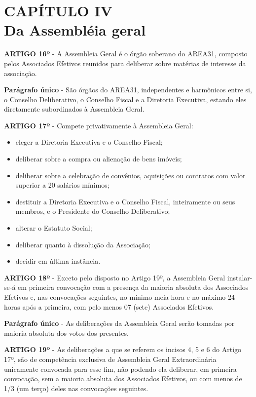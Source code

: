 \chapter*{CAPÍTULO IV \\ Da Assembléia geral}

\textbf{ARTIGO 16º} - A Assembleia Geral é o órgão soberano do AREA31, 
composto pelos Associados Efetivos reunidos para deliberar sobre matérias 
de interesse da associação.

\bigskip

\textbf{Parágrafo único} - São órgãos do AREA31, independentes e harmônicos 
entre si, o Conselho Deliberativo, o Conselho Fiscal e a Diretoria 
Executiva, estando eles diretamente subordinados à Assembleia Geral.

\bigskip

\textbf{ARTIGO 17º} - Compete privativamente à Assembleia Geral:

\begin{itemize}
    \item eleger a Diretoria Executiva e o Conselho Fiscal; 
    \item deliberar sobre a compra ou alienação de bens imóveis;
    \item deliberar sobre a celebração de convênios, aquisições ou contratos 
        com valor superior a 20 salários mínimos;
    \item destituir a Diretoria Executiva e o Conselho Fiscal, inteiramente 
        ou seus membros, e o Presidente do Conselho Deliberativo; 
    \item alterar o Estatuto Social;
    \item deliberar quanto à dissolução da Associação;
    \item decidir em última instância.
\end{itemize}


\textbf{ARTIGO 18º} - Exceto pelo disposto no Artigo 19º, a Assembleia Geral 
instalar-se-á em primeira convocação com a presença da maioria absoluta dos 
Associados Efetivos e, nas convocações seguintes, no mínimo meia hora e no 
máximo 24 horas após a primeira, com pelo menos 07 (sete) Associados Efetivos.

\bigskip

\textbf{Parágrafo único} - As deliberações da Assembleia Geral serão tomadas 
por maioria absoluta dos votos dos presentes.

\bigskip

\textbf{ARTIGO 19º} - As deliberações a que se referem os incisos 4, 5 e 6 
do Artigo 17º, são de competência exclusiva de Assembleia Geral 
Extraordinária unicamente convocada para esse fim, não podendo ela 
deliberar, em primeira convocação, sem a maioria absoluta dos Associados 
Efetivos, ou com menos de 1/3 (um terço) deles nas convocações seguintes.  

